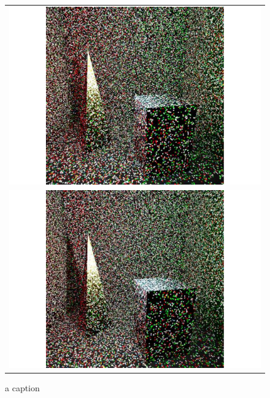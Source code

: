 \begin{figure}
\begin{center}
{\begin{tabular}{c}
\includegraphics*[scale=0.25]{imgs/pqv_frame6.pdf}\\
\includegraphics*[scale=0.25]{imgs/pqv_frame7.pdf}
\end{tabular}
}%
\caption{a caption}
\end{center}
\label{fig:result_images2}
\end{figure}

